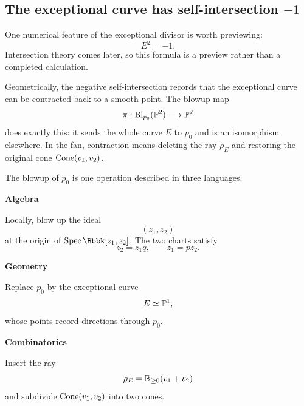 \subsection{The exceptional curve has self-intersection \texorpdfstring{\(-1\)}{-1}}

One numerical feature of the exceptional divisor is worth previewing:
\[
E^2=-1.
\]
Intersection theory comes later, so this formula is a preview rather
than a completed calculation.

Geometrically, the negative self-intersection records that the
exceptional curve can be contracted back to a smooth point. The
blowup map
\[
\pi:\Blp{\PP^2}{p_0}\longrightarrow\PP^2
\]
does exactly this: it sends the whole curve \(E\) to \(p_0\) and is an
isomorphism elsewhere. In the fan, contraction means deleting the ray
\(\rho_E\) and restoring the original cone
\(\Cone{v_1,v_2}\).

\begin{threedictionaries}
The blowup of \(p_0\) is one operation described in three languages.

\medskip

\noindent
\begin{minipage}[t]{0.30\linewidth}
\centering
\textbf{Algebra}\par
\smallskip
Locally, blow up the ideal
\[
(z_1,z_2)
\]
at the origin of
\(\Spec\Bbbk[z_1,z_2]\).
The two charts satisfy
\[
z_2=z_1q,\qquad z_1=pz_2.
\]
\end{minipage}
\hfill
\begin{minipage}[t]{0.30\linewidth}
\centering
\textbf{Geometry}\par
\smallskip
Replace \(p_0\) by the exceptional curve
\[
E\simeq\PP^1,
\]
whose points record directions through \(p_0\).
\end{minipage}
\hfill
\begin{minipage}[t]{0.30\linewidth}
\centering
\textbf{Combinatorics}\par
\smallskip
Insert the ray
\[
\rho_E=\RR_{\geq0}(v_1+v_2)
\]
and subdivide
\(\Cone{v_1,v_2}\) into two cones.
\end{minipage}
\end{threedictionaries}

